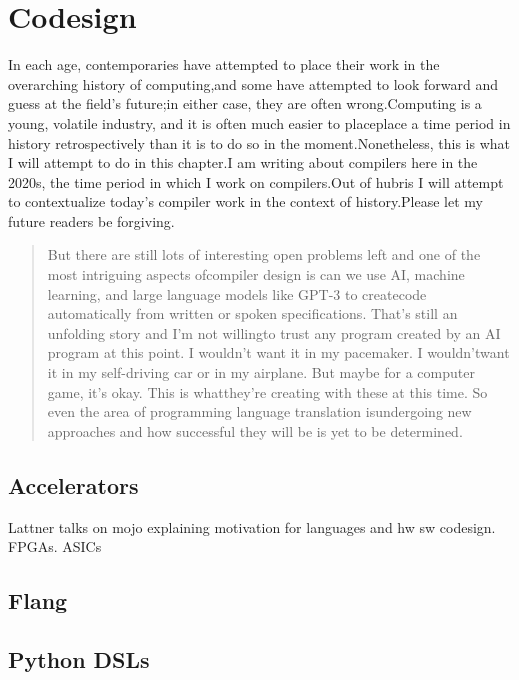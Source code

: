 \chapter{Codesign}

In each age, contemporaries have attempted to place their work in the
overarching history of computing,and some have attempted to look forward and
guess at the field's future;in either case, they are often wrong.Computing is a
young, volatile industry, and it is often much easier to placeplace a time
period in history retrospectively than it is to do so in the
moment.Nonetheless, this is what I will attempt to do in this chapter.I am
writing about compilers here in the 2020s, the time period in which I work on
compilers.Out of hubris I will attempt to contextualize today's compiler work
in the context of history.Please let my future readers be
forgiving.

\begin{quotation}
	But there are still lots of interesting open problems left and one of the most
	intriguing aspects ofcompiler design is can we use AI, machine learning, and
	large language models like GPT-3 to createcode automatically from written or
	spoken specifications. That's still an unfolding story and I'm not willingto
	trust any program created by an AI program at this point. I wouldn't want it in
	my pacemaker. I wouldn'twant it in my self-driving car or in my airplane. But
	maybe for a computer game, it's okay. This is whatthey're creating with these
	at this time. So even the area of programming language translation isundergoing
	new approaches and how successful they will be is yet to be
	determined.\cite{aho_oral_history_2022}
\end{quotation}


\section{Accelerators}
Lattner talks on mojo explaining motivation for languages and hw sw codesign.
FPGAs. ASICs

\section{Flang}
\section{Python DSLs}
